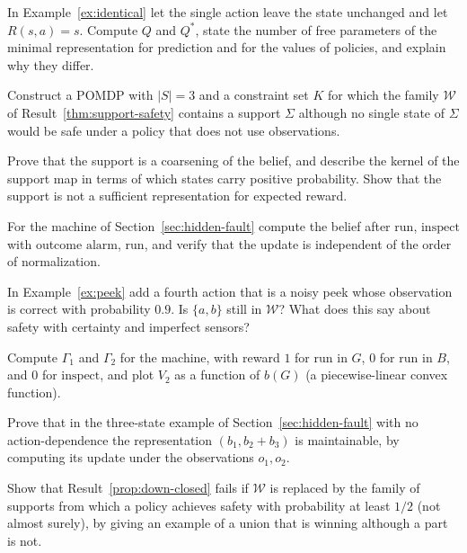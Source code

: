 \begin{exercise}\label{ex:reward-pred}
In Example~\ref{ex:identical} let the single action leave the state unchanged and let $R(s,a)=s$. Compute $Q$ and $Q^{*}$, state the number of free parameters of the minimal representation for prediction and for the values of policies, and explain why they differ.\end{exercise}

\begin{exercise}
Construct a POMDP with $|S|=3$ and a constraint set $K$ for which the family $\mathcal W$ of Result~\ref{thm:support-safety} contains a support $\Sigma$ although no single state of $\Sigma$ would be safe under a policy that does not use observations.
\end{exercise}

\begin{exercise}
Prove that the support is a coarsening of the belief, and describe the kernel of the support map in terms of which states carry positive probability. Show that the support is not a sufficient representation for expected reward.\label{ex2:support-coarse}
\end{exercise}

\begin{exercise}
For the machine of Section~\ref{sec:hidden-fault} compute the belief after $\mathrm{run}$, $\mathrm{inspect}$ with outcome $\mathrm{alarm}$, $\mathrm{run}$, and verify that the update is independent of the order of normalization.
\end{exercise}

\begin{exercise}
In Example~\ref{ex:peek} add a fourth action that is a noisy peek whose observation is correct with probability $0.9$. Is $\{a,b\}$ still in $\mathcal W$? What does this say about safety with certainty and imperfect sensors?
\end{exercise}

\begin{exercise}
Compute $\Gamma_1$ and $\Gamma_2$ for the machine, with reward $1$ for $\mathrm{run}$ in $G$, $0$ for $\mathrm{run}$ in $B$, and $0$ for $\mathrm{inspect}$, and plot $V_2$ as a function of $b(G)$ (a piecewise-linear convex function).
\end{exercise}

\begin{exercise}
Prove that in the three-state example of Section~\ref{sec:hidden-fault} with no action-dependence the representation $(b_1,b_2+b_3)$ is maintainable, by computing its update under the observations $o_1,o_2$.
\end{exercise}

\begin{exercise}
Show that Result~\ref{prop:down-closed} fails if $\mathcal W$ is replaced by the family of supports from which a policy achieves safety with probability at least $1/2$ (not almost surely), by giving an example of a union that is winning although a part is not.
\end{exercise}

